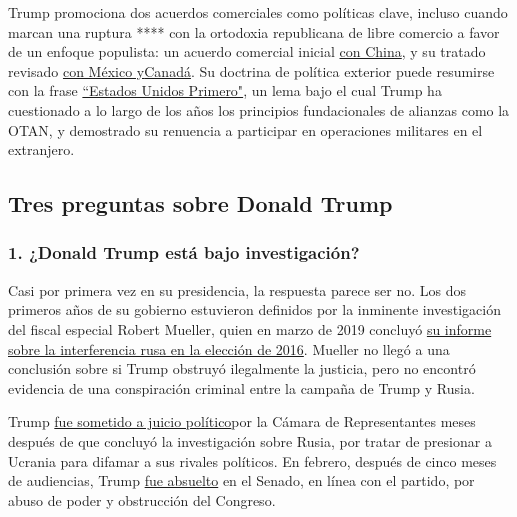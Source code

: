 Trump promociona dos acuerdos comerciales como políticas clave, incluso
cuando marcan una ruptura **** con la ortodoxia republicana de libre
comercio a favor de un enfoque populista: un acuerdo comercial inicial
\href{https://www.nytimes.com/2020/01/15/business/economy/china-trade-deal.html}{con
China}, y su tratado revisado
\href{https://www.nytimes.com/2019/12/01/us/politics/trump-trade-deal-usmca.html}{con
México
y}\href{https://www.nytimes.com/2019/12/01/us/politics/trump-trade-deal-usmca.html}{Canadá}.
Su doctrina de política exterior puede resumirse con la frase
\href{https://www.nytimes.com/2018/12/21/us/politics/trump-mattis-american-first-foreign-policy.html}{``Estados
Unidos Primero"}, un lema bajo el cual Trump ha cuestionado a lo largo
de los años los principios fundacionales de alianzas como la OTAN, y
demostrado su renuencia a participar en operaciones militares en el
extranjero.

\hypertarget{tres-preguntas-sobre-donald-trump}{%
\subsection{Tres preguntas sobre Donald
Trump}\label{tres-preguntas-sobre-donald-trump}}

\hypertarget{1-donald-trump-estuxe1-bajo-investigaciuxf3n}{%
\subsubsection{\texorpdfstring{\textbf{1. ¿Donald Trump está bajo
investigación?}}{1. ¿Donald Trump está bajo investigación?}}\label{1-donald-trump-estuxe1-bajo-investigaciuxf3n}}

Casi por primera vez en su presidencia, la respuesta parece ser no. Los
dos primeros años de su gobierno estuvieron definidos por la inminente
investigación del fiscal especial Robert Mueller, quien en marzo de 2019
concluyó
\href{https://www.nytimes.com/2019/03/24/us/politics/mueller-report-summary.html}{su
informe sobre la interferencia rusa en la elección de 2016}. Mueller no
llegó a una conclusión sobre si Trump obstruyó ilegalmente la justicia,
pero no encontró evidencia de una conspiración criminal entre la campaña
de Trump y Rusia.

Trump
\href{https://www.nytimes.com/2019/12/18/us/politics/trump-impeached.html}{fue
sometido a juicio político}por la Cámara de Representantes meses después
de que concluyó la investigación sobre Rusia, por tratar de presionar a
Ucrania para difamar a sus rivales políticos. En febrero, después de
cinco meses de audiencias, Trump
\href{https://www.nytimes.com/2020/02/05/us/politics/trump-acquitted-impeachment.html}{fue
absuelto} en el Senado, en línea con el partido, por abuso de poder y
obstrucción del Congreso.

